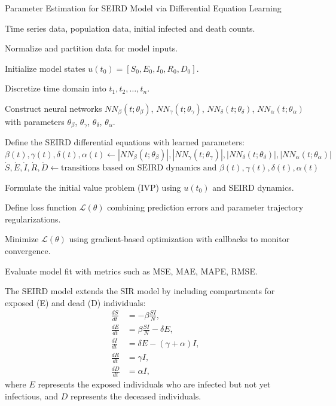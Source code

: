 \documentclass[12pt]{article}
\begin{document}
\begin{algorithm}
\caption{Parameter Estimation for SEIRD Model via Differential Equation Learning}
\begin{algorithmic}[1]

\Require Time series data, population data, initial infected and death counts.

\State Normalize and partition data for model inputs.

\State Initialize model states $u(t_0) = [S_0, E_0, I_0, R_0, D_0]$.

\State Discretize time domain into $t_1, t_2, \ldots, t_n$.

\State Construct neural networks $NN_{\beta}(t;\theta_{\beta})$, $NN_{\gamma}(t;\theta_{\gamma})$, $NN_{\delta}(t;\theta_{\delta})$, $NN_{\alpha}(t;\theta_{\alpha})$ with parameters $\theta_{\beta}$, $\theta_{\gamma}$, $\theta_{\delta}$, $\theta_{\alpha}$.

\State Define the SEIRD differential equations with learned parameters:
    \State $\beta(t), \gamma(t), \delta(t), \alpha(t) \gets |NN_{\beta}(t;\theta_{\beta})|, |NN_{\gamma}(t;\theta_{\gamma})|, |NN_{\delta}(t;\theta_{\delta})|, |NN_{\alpha}(t;\theta_{\alpha})|$
    \State $\dot{S}, \dot{E}, \dot{I}, \dot{R}, \dot{D} \gets \text{transitions based on SEIRD dynamics and } \beta(t), \gamma(t), \delta(t), \alpha(t)$
\EndFunction

\State Formulate the initial value problem (IVP) using $u(t_0)$ and SEIRD dynamics.

\State Define loss function $\mathcal{L}(\theta)$ combining prediction errors and parameter trajectory regularizations.

\State Minimize $\mathcal{L}(\theta)$ using gradient-based optimization with callbacks to monitor convergence.

\State Evaluate model fit with metrics such as MSE, MAE, MAPE, RMSE.

\end{algorithmic}
\end{algorithm}


The SEIRD model extends the SIR model by including compartments for exposed (E) and dead (D) individuals:
\begin{align}
\frac{dS}{dt} &= -\beta \frac{SI}{N}, \\
\frac{dE}{dt} &= \beta \frac{SI}{N} - \delta E, \\
\frac{dI}{dt} &= \delta E - (\gamma + \alpha) I, \\
\frac{dR}{dt} &= \gamma I, \\
\frac{dD}{dt} &= \alpha I,
\end{align}
where $E$ represents the exposed individuals who are infected but not yet infectious, and $D$ represents the deceased individuals.
\end{document}

